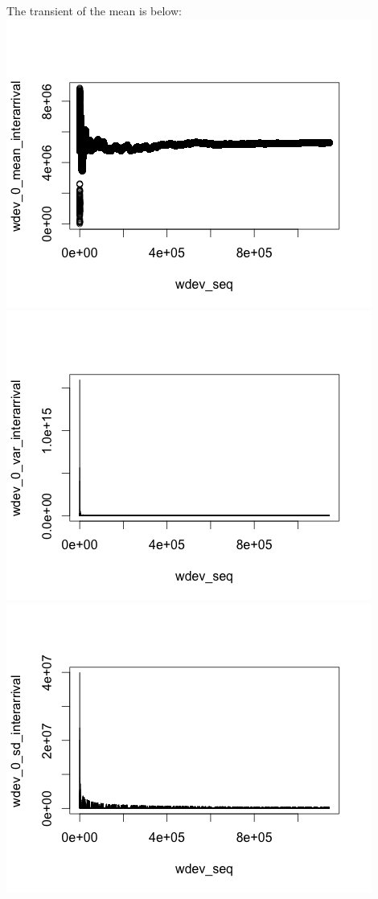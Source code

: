 \documentclass[11pt]{article}
\begin{document}
The transient of the mean is below:  \\
\includegraphics[scale=0.5]{transient_mean1.png}
\includegraphics[scale=0.5]{SD_1.png} \\
\includegraphics[scale=0.5]{SD11.png}
\end{document}
